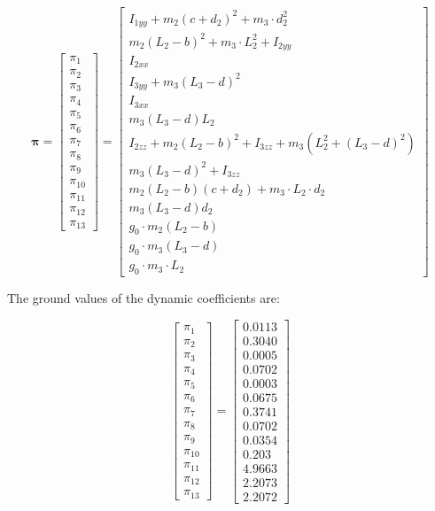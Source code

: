 \documentclass{article}
\begin{document}
\[\bm{\pi}= \begin{bmatrix}
\pi_1 \\ \pi_2 \\ \pi_3 \\ \pi_4 \\ \pi_5 \\ \pi_6 \\ \pi_7 \\ \pi_8 \\  \pi_9 \\ \pi_{10} \\ \pi_{11} \\ \pi_{12} \\ \pi_{13}
\end{bmatrix} = \begin{bmatrix}
I_{1yy}+m_2(c+d_2)^2+m_3\cdot d_2^2 \\ m_2(L_2 -b)^2 + m_3\cdot L_2^2 + I_{2yy} \\ I_{2xx} \\ I_{3yy} + m_3(L_3 - d)^2 \\ I_{3xx} \\ m_3(L_3 -d)L_2 \\ I_{2zz} + m_2(L_2 - b)^2 + I_{3zz} + m_3(L_2^2 + (L_3 - d)^2 ) \\ m_3(L_3 -d)^2 + I_{3zz} \\ m_2(L_2 - b)(c+ d_2) + m_3\cdot L_2\cdot d_2 \\ m_3(L_3 - d)d_2 \\ g_0\cdot m_2(L_2 - b) \\ g_0\cdot m_3(L_3 - d) \\ g_0\cdot m_3\cdot L_2
\end{bmatrix}\]

The ground values of the dynamic coefficients are:

\[\begin{bmatrix}
\pi_1 \\ \pi_2 \\ \pi_3 \\ \pi_4 \\ \pi_5 \\ \pi_6 \\ \pi_7 \\ \pi_8 \\  \pi_9 \\ \pi_{10} \\ \pi_{11} \\ \pi_{12} \\ \pi_{13}
\end{bmatrix}=\begin{bmatrix}
0.0113 \\ 0.3040 \\ 0.0005 \\ 0.0702 \\ 0.0003 \\ 0.0675 \\ 0.3741 \\ 0.0702 \\ 0.0354 \\ 0.203 \\ 4.9663 \\ 2.2073 \\ 2.2072
\end{bmatrix}\]
\end{document}
